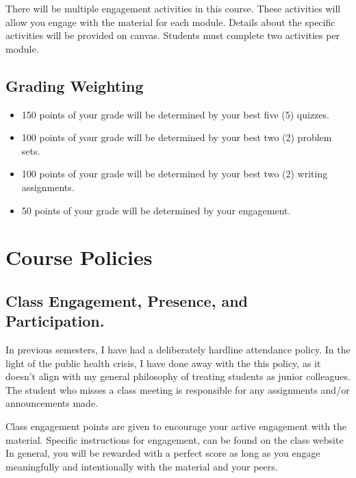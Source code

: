 \documentclass[11pt,]{article}
\providecommand{\tightlist}{%
  \setlength{\itemsep}{0pt}\setlength{\parskip}{0pt}}
\begin{document}
There will be multiple engagement activities in this course. These
activities will allow you engage with the material for each module.
Details about the specific activities will be provided on canvas.
Students must complete two activities per module.

\hypertarget{grading-weighting}{%
\subsection{Grading Weighting}\label{grading-weighting}}

\begin{itemize}
\tightlist
\item
  150 points of your grade will be determined by your best five (5)
  quizzes.
\item
  100 points of your grade will be determined by your best two (2)
  problem sets.
\item
  100 points of your grade will be determined by your best two (2)
  writing assignments.
\item
  50 points of your grade will be determined by your engagement.
\end{itemize}

\hypertarget{course-policies}{%
\section{Course Policies}\label{course-policies}}

\hypertarget{class-engagement-presence-and-participation.}{%
\subsection{Class Engagement, Presence, and
Participation.}\label{class-engagement-presence-and-participation.}}

In previous semesters, I have had a deliberately hardline attendance
policy. In the light of the public health crisis, I have done away with
the this policy, as it doesn't align with my general philosophy of
treating students as junior colleagues. The student who misses a class
meeting is responsible for any assignments and/or announcements made.

Class engagement points are given to encourage your active engagement
with the material. Specific instructions for engagement, can be found on
the class website In general, you will be rewarded with a perfect score
as long as you engage meaningfully and intentionally with the material
and your peers.
\end{document}

